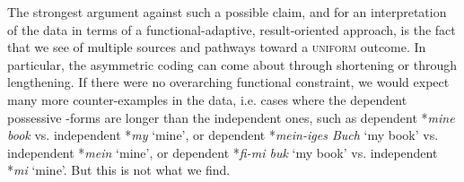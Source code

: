 \documentclass[output=paper]{langsci/langscibook}
\begin{document}
The strongest argument against such a possible claim, and for an interpretation of the data in terms of a functional-adaptive, result-oriented approach, is the fact that we see  of multiple sources and pathways toward a \textsc{uniform} outcome. In particular, the asymmetric coding can come about through shortening or through lengthening. If there were no overarching functional constraint, we would expect many more counter-examples in the data, i.e. cases where the dependent possessive -forms are longer than the independent ones, such as dependent *\textit{mine book} vs. independent *\textit{my} ‘mine’, or  dependent *\textit{mein-iges Buch} ‘my book’ vs. independent *\textit{mein} ‘mine’, or  dependent *\textit{fi-mi buk} ‘my book’ vs. independent *\textit{mi} ‘mine’. But this is not what we find.
\end{document}
